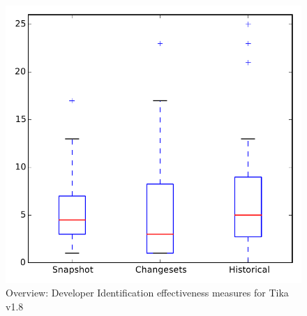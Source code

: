 
\begin{figure}
\centering
\includegraphics[height=0.4\textheight]{figures/dit/all_tika}
\caption{Overview: Developer Identification effectiveness measures for Tika v1.8}
\label{fig:dit:all:tika}
\end{figure}
